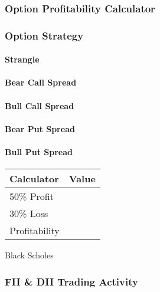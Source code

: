\documentclass[
]{article}
\begin{document}
\hypertarget{option-profitability-calculator}{%
\subsubsection{Option Profitability
Calculator}\label{option-profitability-calculator}}

\hypertarget{option-strategy}{%
\subsubsection{Option Strategy}\label{option-strategy}}

\hypertarget{strangle}{%
\paragraph{Strangle}\label{strangle}}

\hypertarget{bear-call-spread}{%
\paragraph{Bear Call Spread}\label{bear-call-spread}}

\hypertarget{bull-call-spread}{%
\paragraph{Bull Call Spread}\label{bull-call-spread}}

\hypertarget{bear-put-spread}{%
\paragraph{Bear Put Spread}\label{bear-put-spread}}

\hypertarget{bull-put-spread}{%
\paragraph{Bull Put Spread}\label{bull-put-spread}}

\begin{longtable}[]{@{}ll@{}}
\toprule
Calculator & Value \\
\midrule
\endhead
50\% Profit & \\
30\% Loss & \\
Profitability & \\
\bottomrule
\end{longtable}

Black Scholes

\hypertarget{fii-dii-trading-activity}{%
\subsubsection{\texorpdfstring{ FII \& DII Trading
Activity}{ FII \& DII Trading Activity}}\label{fii-dii-trading-activity}}
\end{document}

